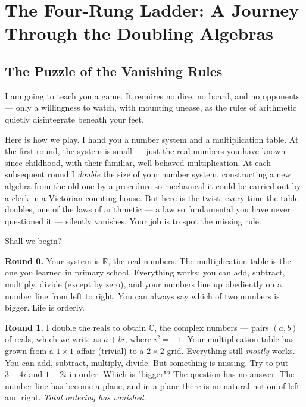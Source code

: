 \chapter{The Four-Rung Ladder: A Journey Through the Doubling Algebras}


\bigskip

\section*{The Puzzle of the Vanishing Rules}

I am going to teach you a game. It requires no dice, no board, and no opponents --- only a willingness to watch, with mounting unease, as the rules of arithmetic quietly disintegrate beneath your feet.

Here is how we play. I hand you a number system and a multiplication table. At the first round, the system is small --- just the real numbers you have known since childhood, with their familiar, well-behaved multiplication. At each subsequent round I \textit{double} the size of your number system, constructing a new algebra from the old one by a procedure so mechanical it could be carried out by a clerk in a Victorian counting house. But here is the twist: every time the table doubles, one of the laws of arithmetic --- a law so fundamental you have never questioned it --- silently vanishes. Your job is to spot the missing rule.

Shall we begin?

\textbf{Round 0.} Your system is $\mathbb{R}$, the real numbers. The multiplication table is the one you learned in primary school. Everything works: you can add, subtract, multiply, divide (except by zero), and your numbers line up obediently on a number line from left to right. You can always say which of two numbers is bigger. Life is orderly.

\textbf{Round 1.} I double the reals to obtain $\mathbb{C}$, the complex numbers --- pairs $(a, b)$ of reals, which we write as $a + bi$, where $i^2 = -1$. Your multiplication table has grown from a $1 \times 1$ affair (trivial) to a $2 \times 2$ grid. Everything still \textit{mostly} works. You can add, subtract, multiply, divide. But something is missing. Try to put $3 + 4i$ and $1 - 2i$ in order. Which is "bigger"? The question has no answer. The number line has become a plane, and in a plane there is no natural notion of left and right. \textit{Total ordering has vanished.}

